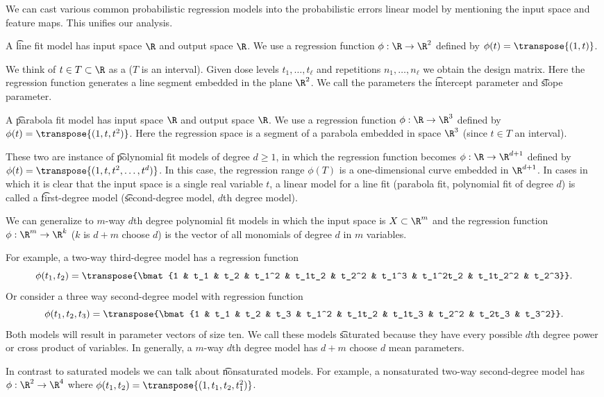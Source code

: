 

We can cast various common probabilistic regression models into the probabilistic errors linear model by mentioning the input space and feature maps.
This unifies our analysis.



A \t{line fit model} has input space $\R$ and output space $\R$.
We use a regression function $\phi: \R \to \R^2$ defined by $\phi(t) = \transpose{(1, t)}$.

We think of $t \in T \subset \R$ as a  ($T$ is an interval).
Given dose levels $t_1, \dots, t_\ell$ and repetitions $n_1, \dots, n_\ell$ we obtain the design matrix.
Here the regression function generates a line segment embedded in the plane $\R^2$.
We call the parameters the \t{intercept parameter} and \t{slope parameter}.

A \t{parabola fit model} has input space $\R$ and output space $\R$.
We use a regression function $\phi: \R \to \R^3$ defined by $\phi(t) = \transpose{(1, t, t^2)}$.
Here the regression space is a segment of a parabola embedded in space $\R^3$ (since $t \in T$ an interval).

These two are instance of \t{polynomial fit models} of degree $d \geq 1$, in which the regression function becomes $\phi: \R \to \R^{d + 1}$ defined by $\phi(t) =  \transpose{(1, t, t^2, \dots, t^d)}$.
In this case, the regression range $\phi(T)$ is a one-dimensional curve embedded in $\R^{d+1}$.
In cases in which it is clear that the input space is a single real variable $t$, a linear model for a line fit (parabola fit, polynomial fit of degree $d$) is called a \t{first-degree model} (\t{second-degree model}, \t{$d$th degree model}).


We can generalize to \t{$m$-way $d$th degree polynomial fit models} in which the input space is $X \subset \R^m$ and the regression function $\phi: \R^m \to \R^k$ ($k$ is $d+m$ choose $d$) is the vector of all monomials of degree $d$ in $m$ variables.

For example, a two-way third-degree model has a regression function
\[
  \phi(t_1, t_2) = \transpose{\bmat{1 & t_1 & t_2 & t_1^2 & t_1t_2 & t_2^2 & t_1^3 & t_1^2t_2 & t_1t_2^2 & t_2^3}}.
\]
Or consider a three way second-degree model with regression function
\[
  \phi(t_1, t_2, t_3) = \transpose{\bmat{1 & t_1 & t_2 & t_3 & t_1^2 & t_1t_2 & t_1t_3 & t_2^2 & t_2t_3 & t_3^2}}.
\]
Both models will result in parameter vectors of size ten.
We call these models \t{saturated} because they have every possible $d$th degree power or cross product of variables.
In generally, a $m$-way $d$th degree model has $d+m$ choose $d$ mean parameters.

In contrast to saturated models we can talk about \t{nonsaturated} models.
For example, a nonsaturated two-way second-degree model has $\phi: \R^2 \to \R^4$ where $\phi(t_1, t_2) = \transpose{(1 , t_1 , t_2 , t_1^2)}$.
